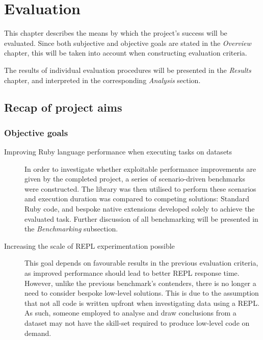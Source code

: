 \chapter{Evaluation}
This chapter describes the means by which the project's success will be evaluated.
Since both subjective and objective goals are stated in the \emph{Overview} chapter, this will be taken into account when constructing evaluation criteria.

The results of individual evaluation procedures will be presented in the \emph{Results} chapter, and interpreted in the corresponding \emph{Analysis} section.

\section{Recap of project aims}
\subsection{Objective goals}
\begin{description}
\item[Improving Ruby language performance when executing tasks on datasets]
In order to investigate whether exploitable performance improvements are given by the completed project, a series of scenario-driven benchmarks were constructed.
The library was then utilised to perform these scenarios and execution duration was compared to competing solutions: Standard Ruby code, and bespoke native extensions developed solely to achieve the evaluated task.
Further discussion of all benchmarking will be presented in the \emph{Benchmarking} subsection.
\item[Increasing the scale of \ac{REPL} experimentation possible]
This goal depends on favourable results in the previous evaluation criteria, as improved performance should lead to better \ac{REPL} response time. However, unlike the previous benchmark's contenders, there is no longer a need to consider bespoke low-level solutions. This is due to the assumption that not all code is written upfront when investigating data using a \ac{REPL}. As such, someone employed to analyse and draw conclusions from a dataset may not have the skill-set required to produce low-level code on demand.
\end{description}

